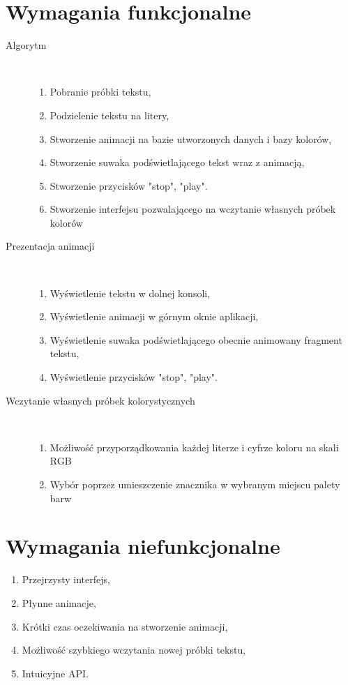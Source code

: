 \documentclass[12pt]{article}
\begin{document}
\section{Wymagania funkcjonalne}
\begin{description}
\item[Algorytm] \hfill \\
\begin{enumerate}
\item{Pobranie próbki tekstu,}
\item{Podzielenie tekstu na litery,}
\item{Stworzenie animacji na bazie utworzonych danych i bazy kolorów,}
\item{Stworzenie suwaka podświetlającego tekst wraz z animacją,}
\item{Stworzenie przycisków "stop", "play".}
\item{Stworzenie interfejsu pozwalającego na wczytanie własnych próbek kolorów}
\end{enumerate}
\item[Prezentacja animacji] \hfill \\
\begin{enumerate}
\item{Wyświetlenie tekstu w dolnej konsoli,}
\item{Wyświetlenie animacji w górnym oknie aplikacji,}
\item{Wyświetlenie suwaka podświetlającego obecnie animowany fragment tekstu,}
\item{Wyświetlenie przycisków "stop", "play".}
\end{enumerate}
\item[Wczytanie własnych próbek kolorystycznych] \hfill \\
\begin{enumerate}
\item{Możliwość przyporządkowania każdej literze i cyfrze koloru na skali RGB}
\item{Wybór poprzez umieszczenie znacznika w wybranym miejscu palety barw}
\end{enumerate}
\end{description}
\section{Wymagania niefunkcjonalne}
\begin{enumerate}
\item{Przejrzysty interfejs,}
\item{Płynne animacje,}
\item{Krótki czas oczekiwania na stworzenie animacji,}
\item{Możliwość szybkiego wczytania nowej próbki tekstu,}
\item{Intuicyjne API.}
\end{enumerate}
\end{document}
